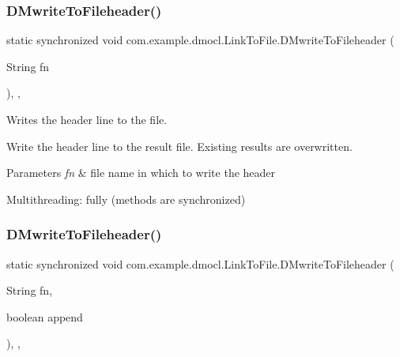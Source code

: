 \subsubsection{\texorpdfstring{D\+Mwrite\+To\+Fileheader()}{DMwriteToFileheader()}\hspace{0.1cm}{\footnotesize\ttfamily [1/2]}}
{\footnotesize\ttfamily static synchronized void com.\+example.\+dmocl.\+Link\+To\+File.\+D\+Mwrite\+To\+Fileheader (\begin{DoxyParamCaption}\item[{String}]{fn }\end{DoxyParamCaption})\hspace{0.3cm}{\ttfamily [inline]}, {\ttfamily [static]}, {\ttfamily [package]}}



Writes the header line to the file. 

Write the header line to the result file. Existing results are overwritten. 
\begin{DoxyParams}{Parameters}
{\em fn} & file name in which to write the header \\
\hline
\end{DoxyParams}
\begin{DoxyParagraph}{Multithreading\+:}
fully (methods are synchronized) 
\end{DoxyParagraph}
\mbox{\label{classcom_1_1example_1_1dmocl_1_1LinkToFile_a8cbd37ee89ecd01dcd55022c6ce74795}} 
\subsubsection{\texorpdfstring{D\+Mwrite\+To\+Fileheader()}{DMwriteToFileheader()}\hspace{0.1cm}{\footnotesize\ttfamily [2/2]}}
{\footnotesize\ttfamily static synchronized void com.\+example.\+dmocl.\+Link\+To\+File.\+D\+Mwrite\+To\+Fileheader (\begin{DoxyParamCaption}\item[{String}]{fn,  }\item[{boolean}]{append }\end{DoxyParamCaption})\hspace{0.3cm}{\ttfamily [inline]}, {\ttfamily [static]}, {\ttfamily [package]}}



